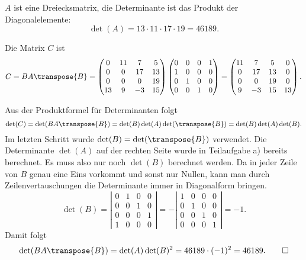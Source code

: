 \begin{loesung}
\begin{teilaufgaben}
\item $A$ ist eine Dreiecksmatrix, die Determinante ist das Produkt der
Diagonalelemente:
\[
\det(A) = 13\cdot 11 \cdot 17\cdot 19=46189.
\]
\item Die Matrix $C$ ist
\[
C
=
BA\transpose{B}
=
\begin{pmatrix}
    0&  11&   7&   5\\
    0&   0&  17&  13\\
    0&   0&   0&  19\\
   13&   9&  -3&  15
\end{pmatrix}
\begin{pmatrix}
0&0&0&1\\
1&0&0&0\\
0&1&0&0\\
0&0&1&0
\end{pmatrix}
=
\begin{pmatrix}
  11&   7&   5&   0\\
   0&  17&  13&   0\\
   0&   0&  19&   0\\
   9&  -3&  15&  13
\end{pmatrix}.
\]
\item Aus der Produktformel für Determinanten folgt
\[
\det(C)
=
\det(BA\transpose{B})
=
\det(B)\det(A)\det(\transpose{B})=\det(B)\det(A)\det(B).
\]
Im letzten Schritt wurde $\det(B)=\det(\transpose{B})$ verwendet.
Die Determinante $\det(A)$ auf der rechten Seite wurde in Teilaufgabe a)
bereits berechnet.
Es muss also nur noch $\det(B)$ berechnet werden.
Da in jeder Zeile von $B$ genau eine Eins vorkommt und sonst nur Nullen,
kann man durch Zeilenvertauschungen die Determinante immer in Diagonalform
bringen.
\[
\det(B)
=
\left|
\begin{matrix}
   0&  1&  0&  0\\
   0&  0&  1&  0\\
   0&  0&  0&  1\\
   1&  0&  0&  0
\end{matrix}\right|
=
-
\left|\begin{matrix}
1&0&0&0\\
0&1&0&0\\
0&0&1&0\\
0&0&0&1
\end{matrix}\right|
=-1.
\]
Damit folgt
\[
\det(BA\transpose{B})
=
\det(A)\det(B)^2
=
46189\cdot(-1)^2=46189.\qedhere
\]
\end{teilaufgaben}
\end{loesung}

